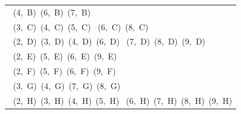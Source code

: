 \begin{center}
\begin{minipage}{\linewidth}
\centering
\renewcommand{\arraystretch}{1.2}
\newcommand{\pixelcoordinata}[1]{\mbox{\cbx{} (#1)}}
\par\medskip
\begin{minipage}[t]{0.49\linewidth}
\vspace{0pt}
\begin{tabular}{|>{\raggedright\arraybackslash}m{\dimexpr\linewidth-2\tabcolsep-2\arrayrulewidth\relax}|}
\hline
\multicolumn{1}{|c|}{\cellcolor{codViola}\textcolor{white}{\textbf{VIOLA}}} \\
\hline
\pixelcoordinata{4, B}\quad \pixelcoordinata{6, B}\quad \pixelcoordinata{7, B} \\[\arrayrulewidth]
\pixelcoordinata{3, C}\quad \pixelcoordinata{4, C}\quad \pixelcoordinata{5, C}\newline
\pixelcoordinata{6, C}\quad \pixelcoordinata{8, C} \\[\arrayrulewidth]
\pixelcoordinata{2, D}\quad \pixelcoordinata{3, D}\quad \pixelcoordinata{4, D}\quad \pixelcoordinata{6, D}\newline
\pixelcoordinata{7, D}\quad \pixelcoordinata{8, D}\quad \pixelcoordinata{9, D} \\[\arrayrulewidth]
\pixelcoordinata{2, E}\quad \pixelcoordinata{5, E}\quad \pixelcoordinata{6, E}\quad \pixelcoordinata{9, E} \\[\arrayrulewidth]
\pixelcoordinata{2, F}\quad \pixelcoordinata{5, F}\quad \pixelcoordinata{6, F}\quad \pixelcoordinata{9, F} \\[\arrayrulewidth]
\pixelcoordinata{3, G}\quad \pixelcoordinata{4, G}\quad \pixelcoordinata{7, G}\quad \pixelcoordinata{8, G} \\[\arrayrulewidth]
\pixelcoordinata{2, H}\quad \pixelcoordinata{3, H}\quad \pixelcoordinata{4, H}\quad \pixelcoordinata{5, H}\newline
\pixelcoordinata{6, H}\quad \pixelcoordinata{7, H}\quad \pixelcoordinata{8, H}\quad \pixelcoordinata{9, H} \\[\arrayrulewidth]

\end{tabular}
\end{minipage}
\end{minipage}
\end{center}
